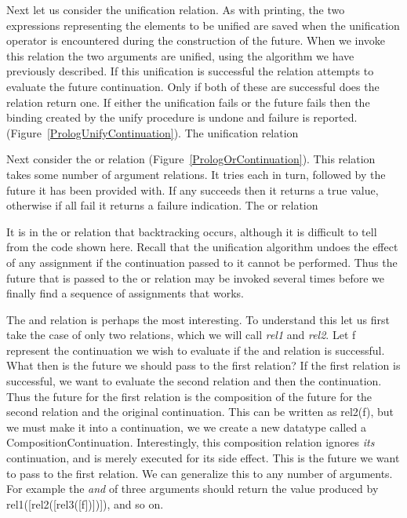 Next let us consider the unification relation.  As with printing, the two
expressions representing the elements to be unified are saved when the
unification operator is encountered during the construction of the future.  When
we invoke this relation the two arguments are unified, using the algorithm we
have previously described.  If this unification is successful the relation
attempts to evaluate the future continuation.  Only if both of these are
successful does the relation return one.  If either the unification fails or the
future fails then the binding created by the {\sf unify} procedure is undone and
failure is reported.  (Figure~\ref{PrologUnifyContinuation}).
%
{The unification relation}

Next consider the {\sf or} relation (Figure~\ref{PrologOrContinuation}).  This
relation takes some number of argument relations.  It tries each in turn,
followed by the future it has been provided with.  If any succeeds then it
returns a true value, otherwise if all fail it returns a failure indication.
%
{The {\sf or} relation}

It is in the {\sf or} relation that backtracking occurs, although it is
difficult to tell from the code shown here.  Recall that the unification
algorithm undoes the effect of any assignment if the continuation passed to it
cannot be performed.  Thus the future that is passed to the {\sf or} relation
may be invoked several times before we finally find a sequence of assignments
that works.

The {\sf and} relation is perhaps the most interesting.  To understand this let
us first take the case of only two relations, which we will call {\em rel1} and
{\em rel2}.  Let {\sf f} represent the continuation we wish to evaluate if the
{\sf and} relation is successful.  What then is the future we should pass to the
first relation?  If the first relation is successful, we want to evaluate the
second relation and then the continuation.  Thus the future for the first
relation is the composition of the future for the second relation and the
original continuation.  This can be written as {\sf rel2(f)}, but we must make
it into a continuation, we we create a new datatype called a {\sf
    CompositionContinuation}.  Interestingly, this composition relation ignores
{\em its} continuation, and is merely executed for its side effect.  This is the
future we want to pass to the first relation.  We can generalize this to any
number of arguments.  For example the {\em and} of three arguments should return
the value produced by {\sf rel1([rel2([rel3([f])])])}, and so on.

